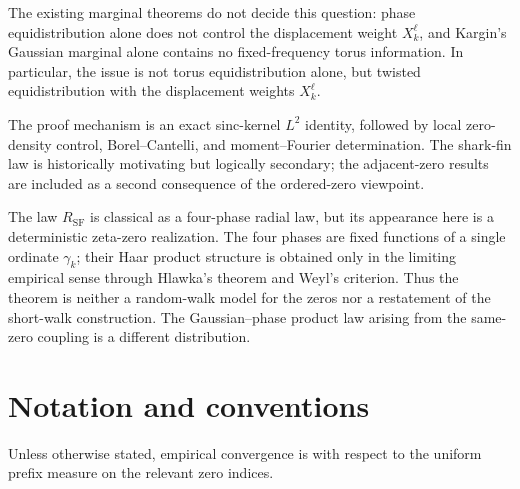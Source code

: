 \documentclass[pdflatex,sn-mathphys-num]{sn-jnl}
\numberwithin{equation}{section}
\theoremstyle{thmstyleone}
\theoremstyle{thmstylethree}
\theoremstyle{thmstyletwo}
\newcommand{\RSF}{R_{\mathrm{SF}}}
\newcommand{\1}{\mathbf 1}
\begin{document}
The existing marginal theorems do not decide this question: phase
equidistribution alone does not control the displacement weight
\(X_k^\ell\), and Kargin's Gaussian marginal alone contains no
fixed-frequency torus information.  In particular, the issue is not torus
equidistribution alone, but twisted equidistribution with the displacement
weights \(X_k^\ell\).

The proof mechanism is an exact sinc-kernel $L^2$ identity, followed by local zero-density control, Borel--Cantelli, and moment--Fourier determination.  The shark-fin law is historically motivating but logically secondary; the adjacent-zero results are included as a second consequence of the ordered-zero viewpoint.

The law \(\RSF\) is classical as a four-phase radial law, but its
appearance here is a deterministic zeta-zero realization.  The four phases are
fixed functions of a single ordinate \(\gamma_k\); their Haar product structure
is obtained only in the limiting empirical sense through Hlawka's theorem and
Weyl's criterion.  Thus the theorem is neither a random-walk model for the
zeros nor a restatement of the short-walk construction.  The Gaussian--phase
product law arising from the same-zero coupling is a different distribution.

\section{Notation and conventions}
Unless otherwise stated, empirical convergence is with respect to the uniform
prefix measure on the relevant zero indices.
\end{document}
